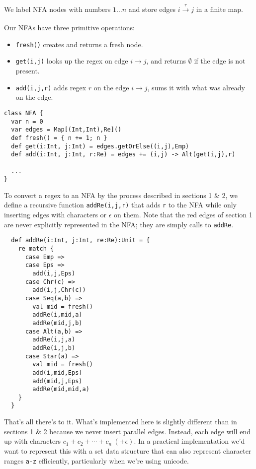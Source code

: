 \documentclass[a4paper, 11pt]{article}
\theoremstyle{definition}
\begin{document}
\noindent We label NFA nodes with numbers $1 \dots n$ and store edges $i \xrightarrow[]{r} j$ in a finite map.

\noindent Our NFAs have three primitive operations:
\begin{itemize}
  \item \texttt{fresh()} creates and returns a fresh node.
  \item \texttt{get(i,j)} looks up the regex on edge $i \to j$, and returns $\emptyset$ if the edge is not present.
  \item \texttt{add(i,j,r)} adds regex $r$ on the edge $i \to j$,  sums it with what was already on the edge.
\end{itemize}

\begin{lstlisting}
class NFA {
  var n = 0
  var edges = Map[(Int,Int),Re]()
  def fresh() = { n += 1; n }
  def get(i:Int, j:Int) = edges.getOrElse((i,j),Emp)
  def add(i:Int, j:Int, r:Re) = edges += (i,j) -> Alt(get(i,j),r)

  ...
}
\end{lstlisting}

\noindent To convert a regex to an NFA by the process described in sections 1 \& 2, we define a recursive function \texttt{addRe(i,j,r)} that adds \texttt{r} to the NFA while only inserting edges with characters or $\epsilon$ on them. Note that the red edges of section 1 are never explicitly represented in the NFA; they are simply calls to \texttt{addRe}.

\begin{lstlisting}
  def addRe(i:Int, j:Int, re:Re):Unit = {
    re match {
      case Emp =>
      case Eps =>
        add(i,j,Eps)
      case Chr(c) =>
        add(i,j,Chr(c))
      case Seq(a,b) =>
        val mid = fresh()
        addRe(i,mid,a)
        addRe(mid,j,b)
      case Alt(a,b) =>
        addRe(i,j,a)
        addRe(i,j,b)
      case Star(a) =>
        val mid = fresh()
        add(i,mid,Eps)
        add(mid,j,Eps)
        addRe(mid,mid,a)
    }
  }
\end{lstlisting}

\noindent That's all there's to it. What's implemented here is slightly different than in sections 1 \& 2 because we never insert parallel edges. Instead, each edge will end up with characters $c_1 + c_2 + \cdots + c_n\ (+ \epsilon)$. In a practical implementation we'd want to represent this with a set data structure that can also represent character ranges \texttt{a-z} efficiently, particularly when we're using unicode.
\end{document}
